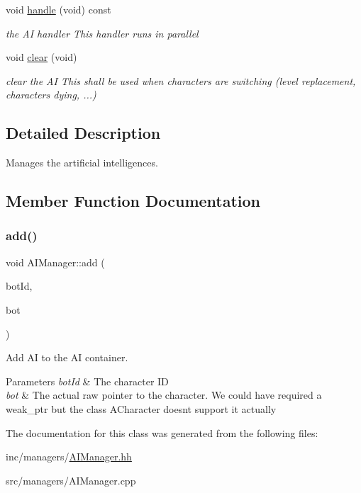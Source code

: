\begin{DoxyCompactItemize}
void \hyperlink{classAIManager_aeb412f42b60c126594377d739440b632}{handle} (void) const
\begin{DoxyCompactList}\small\item\em the AI handler This handler runs in parallel \end{DoxyCompactList}\item 
\mbox{\label{classAIManager_a332f87ed903a2437cb9694bd79fd593e}} 
void \hyperlink{classAIManager_a332f87ed903a2437cb9694bd79fd593e}{clear} (void)
\begin{DoxyCompactList}\small\item\em clear the AI This shall be used when characters are switching (level replacement, characters dying, ...) \end{DoxyCompactList}\end{DoxyCompactItemize}


\subsection{Detailed Description}
Manages the artificial intelligences. 

\subsection{Member Function Documentation}
\mbox{\label{classAIManager_a4722a3719db2ff5ee2f754b539ee2c17}} 
\subsubsection{\texorpdfstring{add()}{add()}}
{\footnotesize\ttfamily void A\+I\+Manager\+::add (\begin{DoxyParamCaption}\item[{Unsigned\+Int}]{bot\+Id,  }\item[{A\+Character $\ast$}]{bot }\end{DoxyParamCaption})}



Add AI to the AI container. 


\begin{DoxyParams}{Parameters}
{\em bot\+Id} & The character ID \\
\hline
{\em bot} & The actual raw pointer to the character. We could have required a weak\+\_\+ptr but the class A\+Character doesnt support it actually \\
\hline
\end{DoxyParams}


The documentation for this class was generated from the following files\+:\begin{DoxyCompactItemize}
\item 
inc/managers/\hyperlink{AIManager_8hh}{A\+I\+Manager.\+hh}\item 
src/managers/A\+I\+Manager.\+cpp\end{DoxyCompactItemize}
